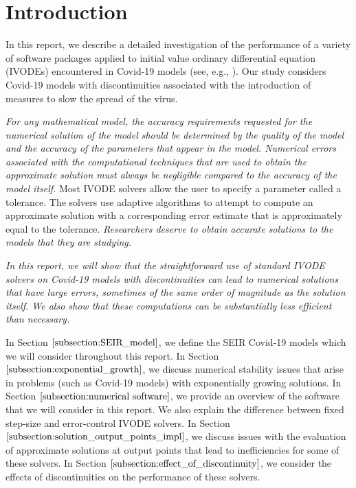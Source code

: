 \section{Introduction}
\label{section:intro}
In this report, we describe a detailed investigation of the performance of a variety of software packages applied to  initial value ordinary 
differential equation (IVODEs) encountered in Covid-19 models (see, e.g., \cite{MR4200336}). Our study considers Covid-19 models with discontinuities associated with the introduction of measures to slow the
spread of the virus.

{\it For any mathematical model, the accuracy requirements requested for the numerical solution of the model should be determined by the quality of the model and the accuracy of the parameters that appear in the model. Numerical errors associated with the computational techniques that are used to obtain the approximate solution must always be negligible compared to the accuracy of the model itself.}
Most IVODE solvers allow the user to specify a parameter called a tolerance. The solvers use adaptive algorithms to attempt to compute an approximate solution with a corresponding error estimate that is approximately equal to the tolerance.
\emph{Researchers deserve to obtain accurate solutions to the models that they are studying.}

\emph{In this report, we will show that the straightforward use of standard IVODE solvers on Covid-19 models with discontinuities can lead to numerical solutions that have large errors, sometimes of the same order of magnitude as the solution itself. We also show that 
these computations can be substantially less efficient than necessary.} 



In Section $\ref{subsection:SEIR_model}$, we define the SEIR Covid-19 models which we will consider throughout this report. In Section $\ref{subsection:exponential_growth}$, we discuss numerical stability issues that arise in problems (such as Covid-19 models) with exponentially growing solutions. In Section $\ref{subsection:numerical software}$,
we provide an overview of the
software that we will consider in this report. We also explain the difference between fixed step-size and error-control IVODE solvers. 
In Section $\ref{subsection:solution_output_points_impl}$,
we discuss issues with the evaluation of approximate solutions at output points that lead to inefficiencies for some of these solvers. In Section $\ref{subsection:effect_of_discontinuity}$, we consider the effects of discontinuities on the performance of these solvers.

